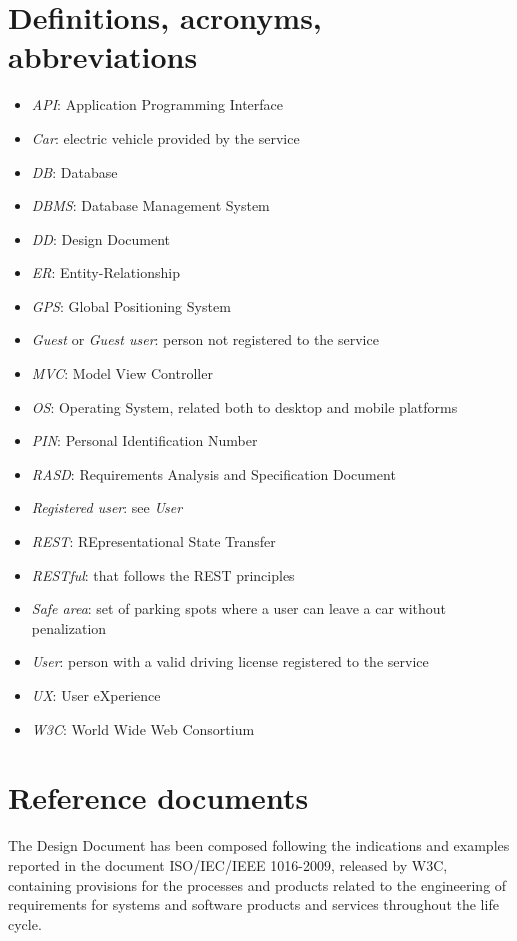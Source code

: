 \section{Definitions, acronyms, abbreviations}
\begin{itemize}
	\item \emph{API}: Application Programming Interface
	\item \emph{Car}: electric vehicle provided by the service
	\item \emph{DB}: Database
	\item \emph{DBMS}: Database Management System
	\item \emph{DD}: Design Document
	\item \emph{ER}: Entity-Relationship
	\item \emph{GPS}: Global Positioning System
	\item \emph{Guest} or \emph{Guest user}: person not registered to the service
	\item \emph{MVC}: Model View Controller
	\item \emph{OS}: Operating System, related both to desktop and mobile platforms
	\item \emph{PIN}: Personal Identification Number
	\item \emph{RASD}: Requirements Analysis and Specification Document
	\item \emph{Registered user}: see \emph{User}
	\item \emph{REST}: REpresentational State Transfer
	\item \emph{RESTful}: that follows the REST principles
	\item \emph{Safe area}: set of parking spots where a user can leave a car without penalization 
	\item \emph{User}: person with a valid driving license registered to the service
	\item \emph{UX}: User eXperience
	\item \emph{W3C}: World Wide Web Consortium
\end{itemize}

\section{Reference documents}
The Design Document has been composed following the indications and examples reported in the document ISO/IEC/IEEE 1016-2009, released by W3C, containing provisions for the processes and products related to the engineering of requirements for systems and software products and services throughout the life cycle.

